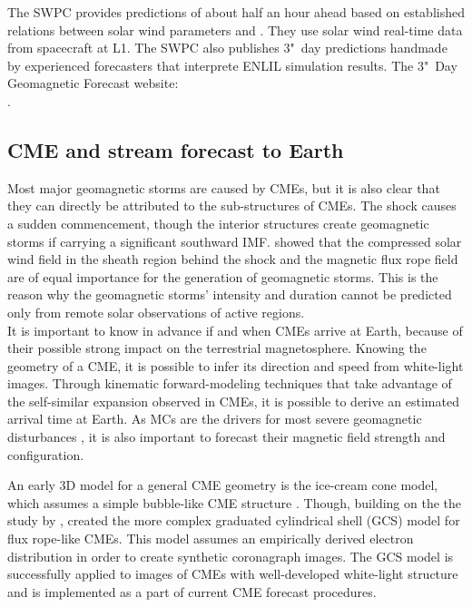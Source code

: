\begin{itemize*}
	\item The SWPC provides \Kp{} predictions of about half an hour ahead based on established relations between solar wind parameters and \Kp{}. They use solar wind real-time data from spacecraft at L1. The SWPC also publishes 3"~day predictions handmade by experienced forecasters that interprete ENLIL simulation results. The 3"~Day Geomagnetic Forecast website:\\
	.
	
\end{itemize*}


\subsection{CME and stream forecast to Earth}
Most major geomagnetic storms are caused by CMEs, but it is also clear that they can directly be attributed to the sub-structures of CMEs. The shock causes a sudden commencement, though the interior structures create geomagnetic storms if carrying a significant southward IMF. \citet{Tsurutani1988} showed that the compressed solar wind field in the sheath region behind the shock and the magnetic flux rope field are of equal importance for the generation of geomagnetic storms. This is the reason why the geomagnetic storms' intensity and duration cannot be predicted only from remote solar observations of active regions.\\

It is important to know in advance if and when CMEs arrive at Earth, because of their possible strong impact on the terrestrial magnetosphere. Knowing the geometry of a CME, it is possible to infer its direction and speed from white-light images. Through kinematic forward-modeling techniques that take advantage of the self-similar expansion observed in CMEs, it is possible to derive an estimated arrival time at Earth. As MCs are the drivers for most severe geomagnetic disturbances \citep{Bothmer1995,Cane2003}, it is also important to forecast their magnetic field strength and configuration.

An early 3D model for a general CME geometry is the ice-cream cone model, which assumes a simple bubble-like CME structure \citep{Fisher1984}. Though, building on the the study by \citet{Cremades2004}, \citet{Thernisien2006} created the more complex graduated cylindrical shell (GCS) model for flux rope-like CMEs. This model assumes an empirically derived electron distribution in order to create synthetic coronagraph images. The GCS model is successfully applied to images of CMEs with well-developed white-light structure \citep{Bosman2012} and is implemented as a part of current CME forecast procedures.\\

